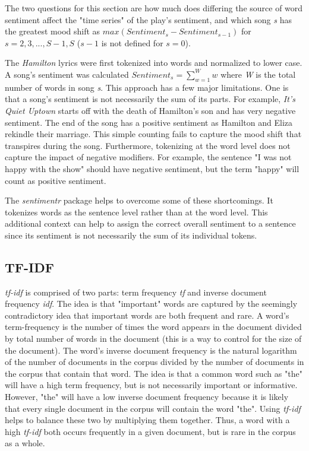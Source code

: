 \documentclass{article}
\begin{document}
The two questions for this section are how much does differing the source of word sentiment affect the "time series" of the play's sentiment, and which song \emph{s} has the greatest mood shift as $max(Sentiment_{s} - Sentiment_{s - 1})$ for $s = 2, 3, ..., S - 1, S$ ($s - 1$ is not defined for $s = 0$).

The \emph{Hamilton} lyrics were first tokenized into words and normalized to lower case. A song's sentiment was calculated $Sentiment_{s} = \sum_{w = 1}^{W}w$ where \emph{W} is the total number of words in song \emph{s}. This approach has a few major limitations. One is that a song's sentiment is not necessarily the sum of its parts. For example, \emph{It's Quiet Uptown} starts off with the death of Hamilton's son and has very negative sentiment. The end of the song has a positive sentiment as Hamilton and Eliza rekindle their marriage. This simple counting fails to capture the mood shift that transpires during the song. Furthermore, tokenizing at the word level does not capture the impact of negative modifiers. For example, the sentence "I was not happy with the show" should have negative sentiment, but the term "happy" will count as positive sentiment.

The \emph{sentimentr} package helps to overcome some of these shortcomings. It tokenizes words as the sentence level rather than at the word level. This additional context can help to assign the correct overall sentiment to a sentence since its sentiment is not necessarily the sum of its individual tokens. 

\subsection{TF-IDF}

\emph{tf-idf} is comprised of two parts: term frequency \emph{tf} and inverse document frequency \emph{idf}. The idea is that "important" words are captured by the seemingly contradictory idea that important words are both frequent and rare. A word's term-frequency is the number of times the word appears in the document divided by total number of words in the document (this is a way to control for the size of the document). The word's inverse document frequency is the natural logarithm of the number of documents in the corpus divided by the number of documents in the corpus that contain that word. The idea is that a common word such as "the" will have a high term frequency, but is not necessarily important or informative. However, "the" will have a low inverse document frequency because it is likely that every single document in the corpus will contain the word "the". Using \emph{tf-idf} helps to balance these two by multiplying them together. Thus, a word with a high \emph{tf-idf} both occurs frequently in a given document, but is rare in the corpus as a whole. 
\end{document}
